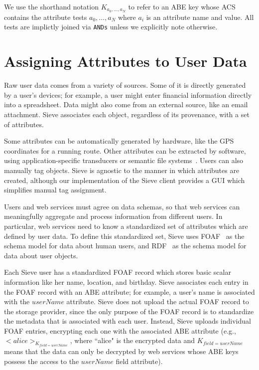 We use the shorthand notation $K_{a_0,\ldots,a_N}$
to refer to an ABE key whose ACS contains the
attribute tests $a_0,\ldots,a_N$ where $a_i$ is 
an attribute name and value. All tests are
implictly joined via \texttt{ANDs} unless we
explicitly note otherwise.

\section{Assigning Attributes to User Data}
\label{sec:attrGen}

Raw user data comes from a variety of
sources. Some of it is directly generated
by a user's devices; for example, a user
might enter financial information directly into a
spreadsheet. Data might also come from an
external source, like an email attachment.
Sieve associates each object, regardless
of its provenance, with a set of attributes.

Some attributes can be automatically generated
by hardware, like the GPS coordinates for a
running route. Other attributes can be
extracted by software, using application-specific
transducers or semantic file systems~\cite{sfs,contextsfs,graphsfs}.
Users can also manually tag objects. Sieve is
agnostic to the manner in which attributes
are created, although our implementation of
the Sieve client provides a GUI which simplifies
manual tag assignment.

Users and web services must agree on data schemas,
so that web services can meaningfully aggregate
and process information from different users. In
particular, web services need to know a
standardized set of attributes which are defined
by user data. To define this standardized set,
Sieve uses FOAF~\cite{FOAF} as the schema %
model for data about human users, and RDF~\cite{RDF} %
as the schema model for data about user objects.

Each Sieve user has a standardized FOAF record
which stores basic scalar information like
her name, location, and birthday. Sieve
associates each entry in the FOAF record
with an ABE attribute; for example, a user's
name is associated with the $userName$ attribute.
Sieve does not upload the actual FOAF record
to the storage provider, since the only purpose
of the FOAF record is to standardize the
metadata that is associated with each user.
Instead, Sieve uploads individual FOAF
entries, encrypting each one with the associated
ABE attribute (e.g., $<alice>_{K_{field=userName}}$,
where ``alice" is the encrypted data and $K_{field=userName}$
 means that the data can only be
decrypted by web services whose ABE keys
possess the access to the $userName$ field attribute).

